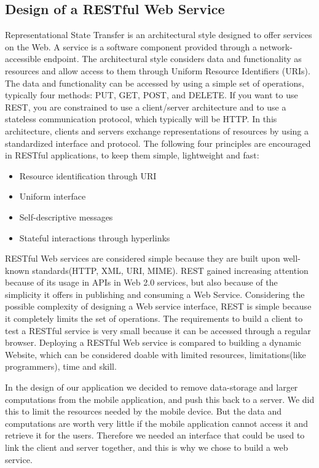\subsection{Design of a RESTful Web Service}
\label{subsec:restDes}

Representational State Transfer is an architectural style designed to offer services on the Web. A service is a software component provided through a network-accessible endpoint. The architectural style considers data and functionality as resources and allow access to them through Uniform Resource Identifiers (URIs). The data and functionality can be accessed by using a simple set of operations, typically four methods: PUT, GET, POST, and DELETE. If you want to use REST, you are constrained to use a client/server architecture and to use a stateless communication protocol, which typically will be HTTP. In this architecture, clients and servers exchange representations of resources by using a standardized interface and protocol. The following four principles are encouraged in RESTful applications, to keep them simple, lightweight and fast\cite{WhatIsRESTful}\cite{DecidingOnRESTful}:
\begin{itemize}
\item Resource identification through URI
\item Uniform interface
\item Self-descriptive messages
\item Stateful interactions through hyperlinks
\end{itemize}

RESTful Web services are considered simple because they are built upon well-known standards(HTTP, XML, URI, MIME). REST gained increasing attention because of its usage in APIs in Web 2.0 services, but also because of the simplicity it offers in publishing and consuming a Web Service. Considering the possible complexity of designing a Web service interface, REST is simple because it completely limits the set of operations. The requirements to build a client to test a RESTful service is very small because it can be accessed through a regular browser. Deploying a RESTful Web service is compared to building a dynamic Website, which can be considered doable with limited resources, limitations(like programmers), time and skill. \cite{DecidingOnRESTful}

In the design of our application we decided to remove data-storage and larger computations from the mobile application, and push this back to a server. We did this to limit the resources needed by the mobile device. But the data and computations are worth very little if the mobile application cannot access it and retrieve it for the users. Therefore we needed an interface that could be used to link the client and server together, and this is why we chose to build a web service.

